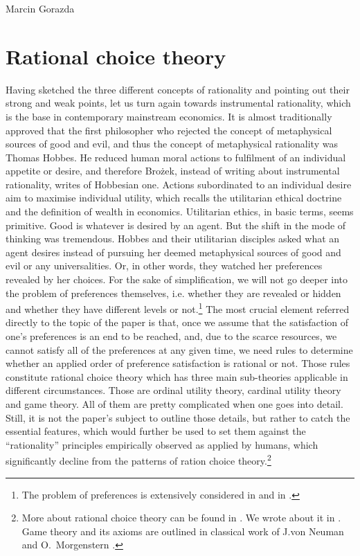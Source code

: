 \begin{artengenv}{Marcin Gorazda}
\section*{Rational choice theory}
Having sketched the three different concepts of rationality and pointing out their strong and weak points, let us turn again towards instrumental rationality, which is the base in contemporary mainstream economics. It is almost traditionally approved that the first philosopher who rejected the concept of metaphysical sources of good and evil, and thus the concept of metaphysical rationality was Thomas Hobbes. He reduced human moral actions to fulfilment of an individual appetite or desire, and therefore Brożek, instead of writing about instrumental rationality, writes of Hobbesian one. Actions subordinated to an individual desire aim to maximise individual utility, which recalls the utilitarian ethical doctrine and the definition of wealth in economics. Utilitarian ethics, in basic terms, seems primitive. Good is whatever is desired by an agent. But the shift in the mode of thinking was tremendous. Hobbes and their utilitarian disciples asked what an agent desires instead of pursuing her deemed metaphysical sources of good and evil or any universalities. Or, in other words, they watched her preferences revealed by her choices. For the sake of simplification, we will not go deeper into the problem of preferences themselves, i.e. whether they are revealed or hidden and whether they have different levels or not.\footnote{The problem of preferences is extensively considered in
\parencite[][]{hausman_economic_2006} %
 and in 
\parencite[][]{kowalski_racjonalnosc_2016}. %
 } The most crucial element referred directly to the topic of the paper is that, once we assume that the satisfaction of one's preferences is an end to be reached, and, due to the scarce resources, we cannot satisfy all of the preferences at any given time, we need rules to determine whether an applied order of preference satisfaction is rational or not. Those rules constitute rational choice theory which has three main sub-theories applicable in different circumstances. Those are ordinal utility theory, cardinal utility theory and game theory. All of them are pretty complicated when one goes into detail. Still, it is not the paper's subject to outline those details, but rather to catch the essential features, which would further be used to set them against the ``rationality'' principles empirically observed as applied by humans, which significantly decline from the patterns of ration choice theory.\footnote{More about rational choice theory can be found in 
\parencites[][]{hausman_economic_2006}[][]{kowalski_racjonalnosc_2016}. %
 We wrote about it in 
\parencite[][]{gorazda_miedzy_2020}. %
 Game theory and its axioms are outlined in classical work of J.von Neuman and O.~Morgenstern 
\parencite*[][]{von_neumann_theory_1944}.%
}


\end{artengenv}
